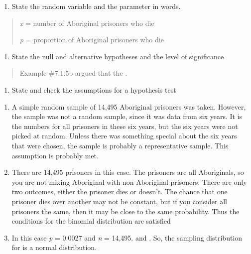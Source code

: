 \documentclass[]{book}
\providecommand{\tightlist}{%
  \setlength{\itemsep}{0pt}\setlength{\parskip}{0pt}}
\begin{document}
\begin{enumerate}
\def\labelenumi{\arabic{enumi}.}
\tightlist
\item
  State the random variable and the parameter in words.
\end{enumerate}

\begin{quote}
\emph{x} = number of Aboriginal prisoners who die

\emph{p} = proportion of Aboriginal prisoners who die
\end{quote}

\begin{enumerate}
\def\labelenumi{\arabic{enumi}.}
\setcounter{enumi}{1}
\tightlist
\item
  State the null and alternative hypotheses and the level of
  significance
\end{enumerate}

\begin{quote}
Example \#7.1.5b argued that the .
\end{quote}

\begin{enumerate}
\def\labelenumi{\arabic{enumi}.}
\setcounter{enumi}{2}
\tightlist
\item
  State and check the assumptions for a hypothesis test
\end{enumerate}

\begin{enumerate}
\def\labelenumi{\alph{enumi}.}
\item
  A simple random sample of 14,495 Aboriginal prisoners was taken.
  However, the sample was not a random sample, since it was data from
  six years. It is the numbers for all prisoners in these six years,
  but the six years were not picked at random. Unless there was
  something special about the six years that were chosen, the sample
  is probably a representative sample. This assumption is probably
  met.
\item
  There are 14,495 prisoners in this case. The prisoners are all
  Aboriginals, so you are not mixing Aboriginal with non-Aboriginal
  prisoners. There are only two outcomes, either the prisoner dies or
  doesn't. The chance that one prisoner dies over another may not be
  constant, but if you consider all prisoners the same, then it may be
  close to the same probability. Thus the conditions for the binomial
  distribution are satisfied
\item
  In this case \emph{p} = 0.0027 and \emph{n} = 14,495. and . So, the sampling
  distribution for is a normal distribution.
\end{enumerate}
\end{document}
